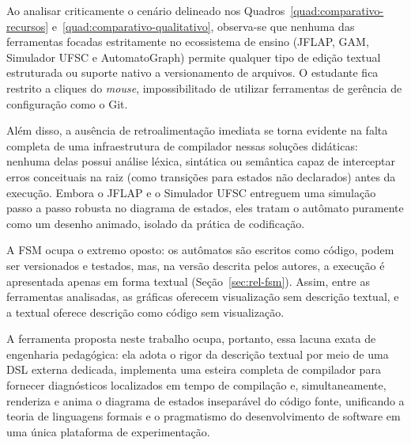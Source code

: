 \documentclass[
    12pt
    ,oneside
    ,a4paper
    ,chapter=TITLE
    ,section=TITLE
    ,sumario=abnt-6027-2012]{abntex2}
\begin{document}
Ao analisar criticamente o cenário delineado nos Quadros~\ref{quad:comparativo-recursos}
e~\ref{quad:comparativo-qualitativo}, observa-se que nenhuma das ferramentas focadas
estritamente no ecossistema de ensino (JFLAP, GAM, Simulador UFSC e AutomatoGraph) permite
qualquer tipo de edição textual estruturada ou suporte nativo a versionamento de arquivos. O
estudante fica restrito a cliques do \textit{mouse}, impossibilitado de utilizar ferramentas
de gerência de configuração como o Git.

Além disso, a ausência de retroalimentação imediata se torna evidente na falta completa de uma
infraestrutura de compilador nessas soluções didáticas: nenhuma delas possui análise léxica,
sintática ou semântica capaz de interceptar erros conceituais na raiz (como transições para
estados não declarados) antes da execução. Embora o JFLAP e o Simulador UFSC entreguem uma
simulação passo a passo robusta no diagrama de estados, eles tratam o autômato puramente como
um desenho animado, isolado da prática de codificação.

A FSM \cite{morazan2014} ocupa o extremo oposto: os autômatos são escritos como código, podem
ser versionados e testados, mas, na versão descrita pelos autores, a execução é apresentada
apenas em forma textual (Seção~\ref{sec:rel-fsm}).
Assim, entre as ferramentas analisadas, as gráficas oferecem visualização sem descrição
textual, e a textual oferece descrição como código sem visualização.

A ferramenta proposta neste trabalho ocupa, portanto, essa lacuna exata de engenharia
pedagógica: ela adota o rigor da descrição textual por meio de uma DSL externa dedicada,
implementa uma esteira completa de compilador para fornecer diagnósticos localizados em tempo
de compilação e, simultaneamente, renderiza e anima o diagrama de estados inseparável do
código fonte, unificando a teoria de linguagens formais e o pragmatismo do desenvolvimento de
software em uma única plataforma de experimentação.
\end{document}

